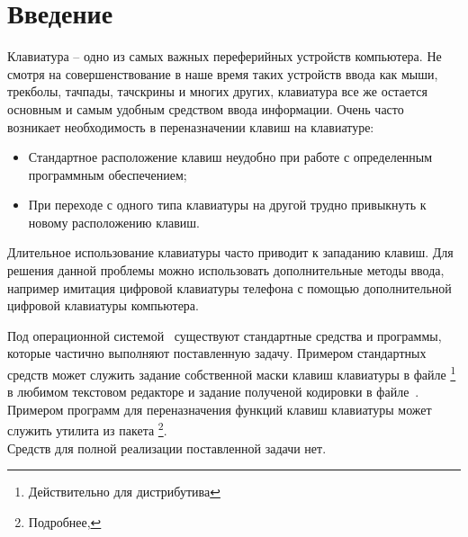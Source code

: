 \section*{Введение}

Клавиатура -- одно из самых важных переферийных устройств компьютера. Не смотря
на совершенствование в наше время таких устройств ввода как мыши, трекболы, тачпады,
тачскрины и многих других, клавиатура все же остается основным и самым удобным средством
ввода информации. 
\newpar
Очень часто возникает необходимость в переназначении клавиш на клавиатуре:
\begin{itemize}
	\item Стандартное расположение клавиш неудобно при работе
		с определенным программным обеспечением;
	\item При переходе с одного типа клавиатуры на другой трудно привыкнуть
		к новому расположению клавиш.
\end{itemize}
\newpar

Длительное использование клавиатуры часто приводит к западанию клавиш.
Для решения данной проблемы можно использовать дополнительные методы ввода,
например имитация цифровой клавиатуры телефона с помощью дополнительной цифровой клавиатуры 
компьютера.
\newpar

Под операционной системой \linux\ существуют стандартные средства и программы, 
которые частично выполняют поставленную задачу. 
Примером стандартных средств может служить задание собственной маски клавиш клавиатуры
в файле \footnote{Действительно для %
дистрибутива \fulllinux} в любимом текстовом редакторе и задание полученой
кодировки в файле \,\footnotemark[1].
Примером программ для переназначения функций клавиш клавиатуры может служить утилита
 из пакета \footnote{Подробнее, }.\\
Средств для полной реализации поставленной задачи нет.
\newpage
